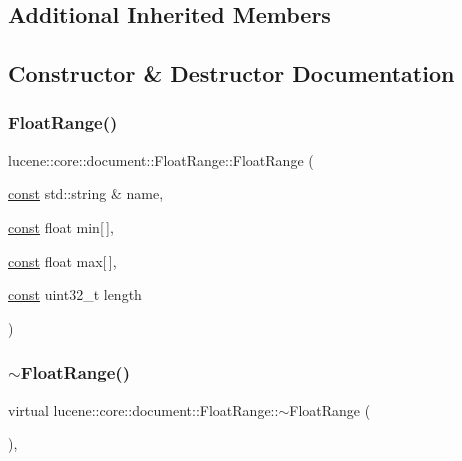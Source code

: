 \subsection*{Additional Inherited Members}


\subsection{Constructor \& Destructor Documentation}
\mbox{\label{classlucene_1_1core_1_1document_1_1FloatRange_a69d45b11fa82af7396120419ece24be4}} 
\subsubsection{\texorpdfstring{Float\+Range()}{FloatRange()}}
{\footnotesize\ttfamily lucene\+::core\+::document\+::\+Float\+Range\+::\+Float\+Range (\begin{DoxyParamCaption}\item[{\mbox{\hyperlink{ZlibCrc32_8h_a2c212835823e3c54a8ab6d95c652660e}{const}} std\+::string \&}]{name,  }\item[{\mbox{\hyperlink{ZlibCrc32_8h_a2c212835823e3c54a8ab6d95c652660e}{const}} float}]{min\mbox{[}$\,$\mbox{]},  }\item[{\mbox{\hyperlink{ZlibCrc32_8h_a2c212835823e3c54a8ab6d95c652660e}{const}} float}]{max\mbox{[}$\,$\mbox{]},  }\item[{\mbox{\hyperlink{ZlibCrc32_8h_a2c212835823e3c54a8ab6d95c652660e}{const}} uint32\+\_\+t}]{length }\end{DoxyParamCaption})\hspace{0.3cm}{\ttfamily [inline]}}

\mbox{\label{classlucene_1_1core_1_1document_1_1FloatRange_a21159cec07e157c991dd7da09fec5ad7}} 
\subsubsection{\texorpdfstring{$\sim$\+Float\+Range()}{~FloatRange()}}
{\footnotesize\ttfamily virtual lucene\+::core\+::document\+::\+Float\+Range\+::$\sim$\+Float\+Range (\begin{DoxyParamCaption}{ }\end{DoxyParamCaption})\hspace{0.3cm}{\ttfamily [inline]}, {\ttfamily [virtual]}}



